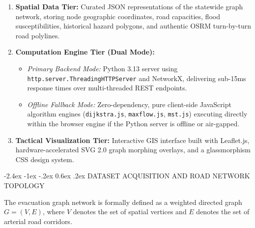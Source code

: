 \documentclass[12pt,oneside]{report}
\makeatletter
\renewcommand{\section}{\@startsection{section}{1}{\z@}%
  {-2.4ex \@plus -1ex \@minus -.2ex}%
  {0.6ex \@plus .2ex}%
  {\normalfont\large\bfseries}}
\makeatother
\begin{document}
\begin{enumerate}
    \item \textbf{Spatial Data Tier:} Curated JSON representations of the statewide graph network, storing node geographic coordinates, road capacities, flood susceptibilities, historical hazard polygons, and authentic OSRM turn-by-turn road polylines.
    \item \textbf{Computation Engine Tier (Dual Mode):}
    \begin{itemize}
        \item \textit{Primary Backend Mode:} Python 3.13 server using \texttt{http.server.ThreadingHTTPServer} and NetworkX, delivering sub-15ms response times over multi-threaded REST endpoints.
        \item \textit{Offline Fallback Mode:} Zero-dependency, pure client-side JavaScript algorithm engines (\texttt{dijkstra.js}, \texttt{maxflow.js}, \texttt{mst.js}) executing directly within the browser engine if the Python server is offline or air-gapped.
    \end{itemize}
    \item \textbf{Tactical Visualization Tier:} Interactive GIS interface built with Leaflet.js, hardware-accelerated SVG 2.0 graph morphing overlays, and a glassmorphism CSS design system.
\end{enumerate}

\section{DATASET ACQUISITION AND ROAD NETWORK TOPOLOGY}

The evacuation graph network is formally defined as a weighted directed graph $G = (V, E)$, where $V$ denotes the set of spatial vertices and $E$ denotes the set of arterial road corridors.
\end{document}
